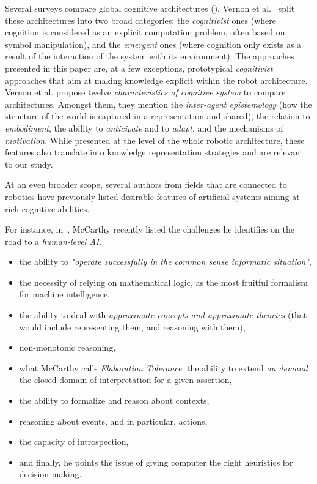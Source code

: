 \documentclass[a4paper, twocolumn]{article}
\begin{document}
Several surveys compare global cognitive architectures (\cite{Vernon2007, Chong2009}).
Vernon et al.~\cite{Vernon2007} split these architectures into two broad
categories: the \emph{cognitivist} ones (where cognition is considered as an
explicit computation problem, often based on symbol manipulation), and the
\emph{emergent} ones (where cognition only exists as a result of the
interaction of the system with its environment). The approaches presented in
this paper are, at a few exceptions, prototypical \emph{cognitivist} approaches
that aim at making knowledge explicit within the robot architecture. Vernon et
al. propose twelve \emph{characteristics of cognitive system} to compare
architectures. Amongst them, they mention the \emph{inter-agent epistemology} (how
the structure of the world is captured in a representation and shared), the
relation to \emph{embodiment}, the ability to \emph{anticipate} and to
\emph{adapt}, and the mechanisms of \emph{motivation}. While presented at the
level of the whole robotic architecture, these features also translate into
knowledge representation strategies and are relevant to our study.

At an even broader scope, several authors from fields that are connected to robotics
have previously listed desirable features of artificial systems aiming at
rich cognitive abilities.

For instance, in~\cite{McCarthy2007}, McCarthy recently listed the challenges
he identifies on the road to a \emph{human-level AI}.

\begin{itemize}

	\item the ability to \emph{"operate successfully in the common sense
	informatic situation"},

	\item the necessity of relying on mathematical logic, as the most fruitful
	formalism for machine intelligence,

	\item the ability to deal with \emph{approximate concepts and approximate
	theories} (that would include representing them, and reasoning with them),

	\item non-monotonic reasoning,

	\item what McCarthy calls \emph{Elaboration Tolerance}: the ability to
	extend \emph{on demand} the closed domain of interpretation for a
	given assertion,

	\item the ability to formalize and reason about contexts,

	\item reasoning about events, and in particular, actions,

	\item the capacity of introspection,

	\item and finally, he points the issue of giving computer the right
	heuristics for decision making.

\end{itemize}
\end{document}
